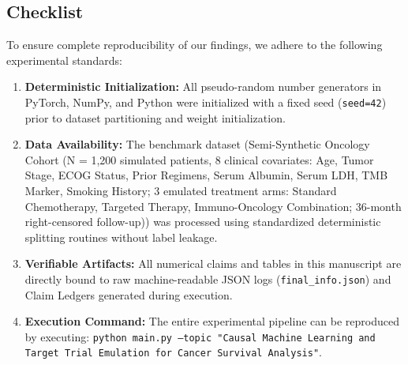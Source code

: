 \documentclass[10pt,twocolumn]{article}
\begin{document}
\subsection{Checklist}
To ensure complete reproducibility of our findings, we adhere to the following experimental standards:
\begin{enumerate}
  \item \textbf{Deterministic Initialization:} All pseudo-random number generators in PyTorch, NumPy, and Python were initialized with a fixed seed (\texttt{seed=42}) prior to dataset partitioning and weight initialization.
  \item \textbf{Data Availability:} The benchmark dataset (Semi-Synthetic Oncology Cohort (N = 1,200 simulated patients, 8 clinical covariates: Age, Tumor Stage, ECOG Status, Prior Regimens, Serum Albumin, Serum LDH, TMB Marker, Smoking History; 3 emulated treatment arms: Standard Chemotherapy, Targeted Therapy, Immuno-Oncology Combination; 36-month right-censored follow-up)) was processed using standardized deterministic splitting routines without label leakage.
  \item \textbf{Verifiable Artifacts:} All numerical claims and tables in this manuscript are directly bound to raw machine-readable JSON logs (\texttt{final\_info.json}) and Claim Ledgers generated during execution.
  \item \textbf{Execution Command:} The entire experimental pipeline can be reproduced by executing: \texttt{python main.py --topic "Causal Machine Learning and Target Trial Emulation for Cancer Survival Analysis"}.
\end{enumerate}
\end{document}
